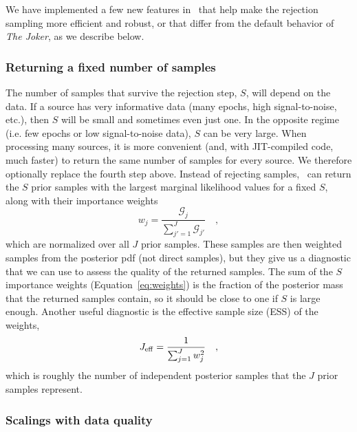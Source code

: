 \documentclass[twocolumn]{AASTeX7/aastex701}
\newcommand{\harv}{\package{harv}}
\newcommand{\joker}{\textsl{The Joker}}
\begin{document}
We have implemented a few new features in \harv\ that help make the rejection sampling
more efficient and robust, or that differ from the default behavior of \joker, as we
describe below.


\subsubsection{Returning a fixed number of samples}

The number of samples that survive the rejection step, $S$, will depend on the data.
If a source has very informative data (many epochs, high signal-to-noise, etc.), then
$S$ will be small and sometimes even just one.
In the opposite regime (i.e. few epochs or low signal-to-noise data), $S$ can be very
large.
When processing many sources, it is more convenient (and, with JIT-compiled code, much
faster) to return the same number of samples for every source.
We therefore optionally replace the fourth step above.
Instead of rejecting samples, \harv\ can return the $S$ prior samples with the largest
marginal likelihood values for a fixed $S$, along with their importance weights
\begin{equation}
  w_j = \frac{\mathcal{G}_j}{\sum_{j'=1}^{J} \mathcal{G}_{j'}}
  \quad ,
  \label{eq:weights}
\end{equation}
which are normalized over all $J$ prior samples.
These samples are then weighted samples from the posterior pdf (not direct samples), but
they give us a diagnostic that we can use to assess the quality of the returned samples.
The sum of the $S$ importance weights (Equation~\ref{eq:weights}) is the fraction of the
posterior mass that the returned samples contain, so it should be close to one if $S$ is
large enough.
Another useful diagnostic is the effective sample size (ESS) of the weights,
\begin{equation}
  J_{\rm eff} = \frac{1}{\sum_{j=1}^{J} w_j^2}
  \quad ,
  \label{eq:ess}
\end{equation}
which is roughly the number of independent posterior samples that the $J$ prior samples
represent.


\subsubsection{Scalings with data quality}
\label{sec:methods-scaling}
\end{document}

